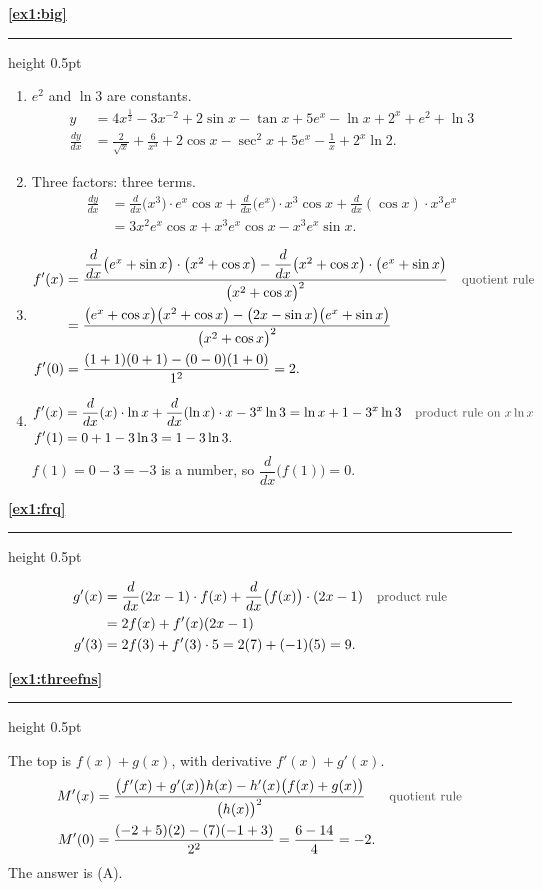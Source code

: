\documentclass[11pt,a4paper]{article}
\newcommand{\solitem}[2]{%
 \par\addvspace{16pt}\Needspace{10\baselineskip}%
 {\large\bfseries \ref{#1}}\par\nobreak\vspace{2pt}%
 {\color{rulegray}\hrule height 0.5pt}\nobreak\vspace{7pt}%
 #2\par}
\newcommand{\why}[1]{\text{\small\color{darkgray}#1}}
\begin{document}
\solitem{ex1:big}{%
\begin{enumerate}[label=(\alph*)]
 \item $e^2$ and $\ln3$ are constants.
 \begin{align*}
 y&=4x^{\frac12}-3x^{-2}+2\sin x-\tan x+5e^x-\ln x+2^x+e^2+\ln3\\
 \frac{dy}{dx}&=\frac{2}{\sqrt x}+\frac{6}{x^3}+2\cos x-\sec^2x+5e^x-\frac1x+2^x\ln2.
 \end{align*}
 \item Three factors: three terms.
 \begin{align*}
 \frac{dy}{dx}&=\frac{d}{dx}\bigl(x^3\bigr)\cdot e^x\cos x+\frac{d}{dx}\bigl(e^x\bigr)\cdot x^3\cos x+\frac{d}{dx}(\cos x)\cdot x^3e^x\\
 &=3x^2e^x\cos x+x^3e^x\cos x-x^3e^x\sin x.
 \end{align*}
 \item
 \begin{align*}
 f'(x)&=\frac{\dfrac{d}{dx}\bigl(e^x+\sin x\bigr)\cdot\bigl(x^2+\cos x\bigr)-\dfrac{d}{dx}\bigl(x^2+\cos x\bigr)\cdot\bigl(e^x+\sin x\bigr)}{\bigl(x^2+\cos x\bigr)^2} &&\why{quotient rule}\\
 &=\frac{\bigl(e^x+\cos x\bigr)\bigl(x^2+\cos x\bigr)-\bigl(2x-\sin x\bigr)\bigl(e^x+\sin x\bigr)}{\bigl(x^2+\cos x\bigr)^2}\\
 f'(0)&=\frac{(1+1)(0+1)-(0-0)(1+0)}{1^2}=2.
 \end{align*}
 \item
 \begin{align*}
 f'(x)&=\frac{d}{dx}(x)\cdot\ln x+\frac{d}{dx}(\ln x)\cdot x-3^x\ln3=\ln x+1-3^x\ln3 &&\why{product rule on $x\ln x$}\\
 f'(1)&=0+1-3\ln3=1-3\ln3.
 \end{align*}
 $f(1)=0-3=-3$ is a number, so $\dfrac{d}{dx}\bigl(f(1)\bigr)=0$.
\end{enumerate}
}

\solitem{ex1:frq}{%
\begin{align*}
g'(x)&=\frac{d}{dx}(2x-1)\cdot f(x)+\frac{d}{dx}\bigl(f(x)\bigr)\cdot(2x-1) &&\why{product rule}\\
&=2f(x)+f'(x)(2x-1)\\
g'(3)&=2f(3)+f'(3)\cdot5=2(7)+(-1)(5)=9.
\end{align*}
}

\solitem{ex1:threefns}{%
The top is $f(x)+g(x)$, with derivative $f'(x)+g'(x)$.
\begin{align*}
M'(x)&=\frac{\bigl(f'(x)+g'(x)\bigr)h(x)-h'(x)\bigl(f(x)+g(x)\bigr)}{\bigl(h(x)\bigr)^2} &&\why{quotient rule}\\
M'(0)&=\frac{(-2+5)(2)-(7)(-1+3)}{2^2}=\frac{6-14}{4}=-2.
\end{align*}
The answer is (A).
}
\end{document}
